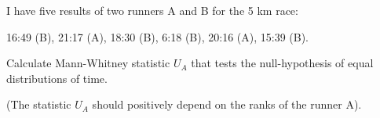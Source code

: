 
\begin{question}
I have five results of two runners A and B for the 5 km race:

16:49 (B), 21:17 (A), 18:30 (B), 6:18 (B), 20:16 (A), 15:39 (B).

Calculate Mann-Whitney statistic \(U_A\) that tests the null-hypothesis of equal distributions of time.

(The statistic \(U_A\) should positively depend on the ranks of the runner A).
\end{question}


